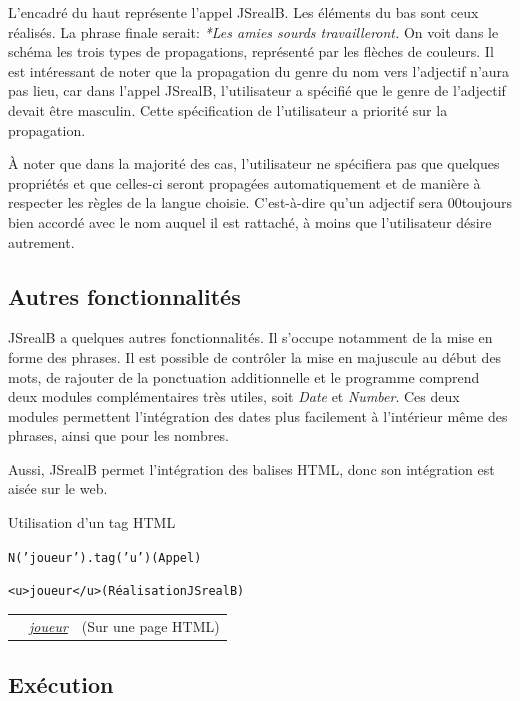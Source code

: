 \documentclass[11pt]{article} %
\newcommand{\system}[1]{\textsf{#1}}
\newcommand{\JSB}{\system{JSrealB}}
\newcommand{\real}[1]{\emph{#1}}
\begin{document}
L'encadré du haut représente l'appel \JSB{}. Les éléments du bas sont ceux
réalisés. La phrase finale serait: \real{*Les amies sourds travailleront.}
On voit dans le schéma les trois types de propagations, représenté
par les flèches de couleurs. Il est intéressant de noter que la propagation
du genre du nom vers l'adjectif n'aura pas lieu, car dans l'appel
\JSB{}, l'utilisateur a spécifié que le genre de l'adjectif devait
être masculin. Cette spécification de l'utilisateur a priorité sur
la propagation.

À noter que dans la majorité des cas, l'utilisateur ne spécifiera pas
que quelques propriétés et que celles-ci seront propagées automatiquement
et de manière à respecter les règles de la langue choisie. C'est-à-dire qu'un
adjectif sera 00toujours bien accordé avec le nom auquel il est rattaché, à moins
que l'utilisateur désire autrement.

\subsection{Autres fonctionnalités}

\JSB{} a quelques autres fonctionnalités. Il s'occupe notamment de
la mise en forme des phrases. Il est possible de contrôler la mise
en majuscule au début des mots, de rajouter de la ponctuation additionnelle
et le programme comprend deux modules complémentaires très utiles,
soit \emph{Date} et \emph{Number}. Ces deux modules permettent l'intégration
des dates plus facilement à l'intérieur même des phrases, ainsi que
pour les nombres. 

Aussi, \JSB{} permet l'intégration des balises HTML, donc son intégration
est aisée sur le web. \\
\begin{example}
\caption{Utilisation d'un tag HTML}
\begin{alltt}
  N('joueur').tag('u')    \textnormal{(Appel)}
    
  <u>joueur</u>           \textnormal{(Réalisation \JSB{})}
\end{alltt}
\begin{tabular}{p{0.4cm} p{3.8cm} c}
 & \real{\underline{joueur}} & (Sur une page HTML)
\end{tabular}
\end{example}

\subsection{Exécution}
\label{subsec:exec}
\end{document}
